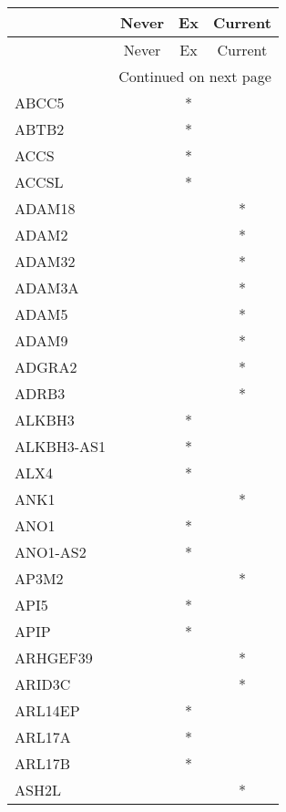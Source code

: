 \begin{longtable}{lccc}
\toprule
{} & Never & Ex & Current \\
\midrule
\endfirsthead

\toprule
{} & Never & Ex & Current \\
\midrule
\endhead
\midrule
\multicolumn{4}{r}{{Continued on next page}} \\
\midrule
\endfoot

\bottomrule
\endlastfoot
ABCC5         &       &  * &         \\
ABTB2         &       &  * &         \\
ACCS          &       &  * &         \\
ACCSL         &       &  * &         \\
ADAM18        &       &    &       * \\
ADAM2         &       &    &       * \\
ADAM32        &       &    &       * \\
ADAM3A        &       &    &       * \\
ADAM5         &       &    &       * \\
ADAM9         &       &    &       * \\
ADGRA2        &       &    &       * \\
ADRB3         &       &    &       * \\
ALKBH3        &       &  * &         \\
ALKBH3-AS1    &       &  * &         \\
ALX4          &       &  * &         \\
ANK1          &       &    &       * \\
ANO1          &       &  * &         \\
ANO1-AS2      &       &  * &         \\
AP3M2         &       &    &       * \\
API5          &       &  * &         \\
APIP          &       &  * &         \\
ARHGEF39      &       &    &       * \\
ARID3C        &       &    &       * \\
ARL14EP       &       &  * &         \\
ARL17A        &       &  * &         \\
ARL17B        &       &  * &         \\
ASH2L         &       &    &       * \\

\end{longtable}
